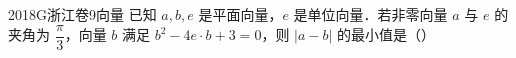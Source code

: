
\begin{problem}{2018}{G}{浙江卷}{9}{向量}
已知 $ a,b,e $ 是平面向量，$ e $ 是单位向量．若非零向量 $ a $ 与 $ e $ 的夹角为 $ \dfrac{\pi}{3} $，向量 $ b $ 满足 $ b^2-4e\cdot b+3=0 $，则 $ |a-b| $ 的最小值是（\hspace{1cm}）
\begin{choices}
\end{choices}
\end{problem}

\begin{answer}

\end{answer}

\begin{solutions}

\end{solutions}